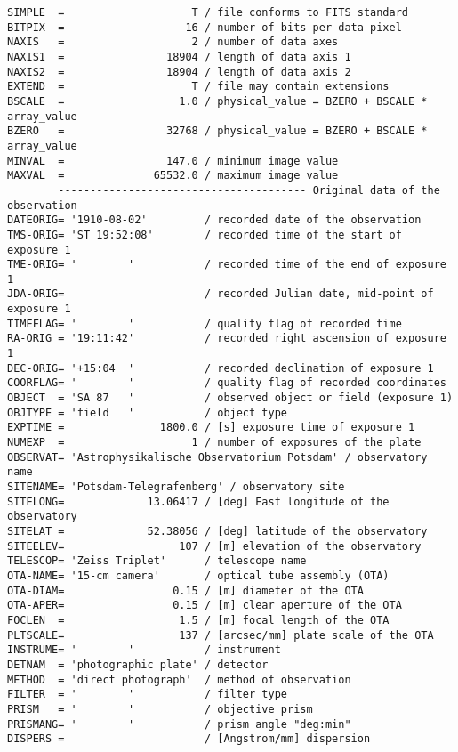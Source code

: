 \documentclass[11pt]{ivoa}
\begin{document}
\begin{lstlisting}
SIMPLE  =                    T / file conforms to FITS standard
BITPIX  =                   16 / number of bits per data pixel
NAXIS   =                    2 / number of data axes
NAXIS1  =                18904 / length of data axis 1
NAXIS2  =                18904 / length of data axis 2
EXTEND  =                    T / file may contain extensions
BSCALE  =                  1.0 / physical_value = BZERO + BSCALE * array_value
BZERO   =                32768 / physical_value = BZERO + BSCALE * array_value
MINVAL  =                147.0 / minimum image value
MAXVAL  =              65532.0 / maximum image value
        --------------------------------------- Original data of the observation
DATEORIG= '1910-08-02'         / recorded date of the observation
TMS-ORIG= 'ST 19:52:08'        / recorded time of the start of exposure 1
TME-ORIG= '        '           / recorded time of the end of exposure 1
JDA-ORIG=                      / recorded Julian date, mid-point of exposure 1
TIMEFLAG= '        '           / quality flag of recorded time
RA-ORIG = '19:11:42'           / recorded right ascension of exposure 1
DEC-ORIG= '+15:04  '           / recorded declination of exposure 1
COORFLAG= '        '           / quality flag of recorded coordinates
OBJECT  = 'SA 87   '           / observed object or field (exposure 1)
OBJTYPE = 'field   '           / object type
EXPTIME =               1800.0 / [s] exposure time of exposure 1
NUMEXP  =                    1 / number of exposures of the plate
OBSERVAT= 'Astrophysikalische Observatorium Potsdam' / observatory name
SITENAME= 'Potsdam-Telegrafenberg' / observatory site
SITELONG=             13.06417 / [deg] East longitude of the observatory
SITELAT =             52.38056 / [deg] latitude of the observatory
SITEELEV=                  107 / [m] elevation of the observatory
TELESCOP= 'Zeiss Triplet'      / telescope name
OTA-NAME= '15-cm camera'       / optical tube assembly (OTA)
OTA-DIAM=                 0.15 / [m] diameter of the OTA
OTA-APER=                 0.15 / [m] clear aperture of the OTA
FOCLEN  =                  1.5 / [m] focal length of the OTA
PLTSCALE=                  137 / [arcsec/mm] plate scale of the OTA
INSTRUME= '        '           / instrument
DETNAM  = 'photographic plate' / detector
METHOD  = 'direct photograph'  / method of observation
FILTER  = '        '           / filter type
PRISM   = '        '           / objective prism
PRISMANG= '        '           / prism angle "deg:min"
DISPERS =                      / [Angstrom/mm] dispersion

\end{lstlisting}
\end{document}
